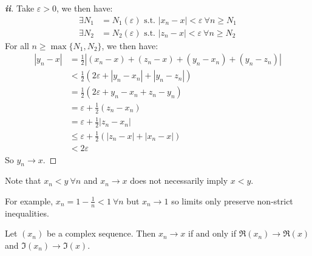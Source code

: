 \documentclass[../main.tex]{subfiles}
\begin{document}
\begin{proof}[\textbf{ii}]
  Take $\varepsilon > 0$, we then have:
  \begin{align*}
    \exists N_1 &= N_1(\varepsilon) \text{ s.t. } |x_n - x| < \varepsilon\ \forall n \geq N_1 \\
    \exists N_2 &= N_2(\varepsilon) \text{ s.t. } |z_n - x| < \varepsilon\ \forall n \geq N_2
  \end{align*}
  For all $n \geq \max\{N_1, N_2\}$, we then have:
  \begin{align*}
    |y_n - x| &= \frac{1}{2}|(x_n - x) + (z_n - x) + (y_n - x_n) + (y_n - z_n)| \\
              &< \frac{1}{2}(2\varepsilon + |y_n - x_n| + |y_n - z_n|) \\
              &= \frac{1}{2}(2\varepsilon + y_n - x_n + z_n - y_n) \\
              &= \varepsilon + \frac{1}{2}(z_n - x_n) \\
              &= \varepsilon + \frac{1}{2}|z_n - x_n| \\
              &\leq \varepsilon + \frac{1}{2}(|z_n - x| + |x_n - x|) \\
              &< 2\varepsilon
  \end{align*}
  So $y_n \to x$.
\end{proof}
\begin{remark}
  Note that $x_n < y\ \forall n$ and $x_n \to x$ does not necessarily imply $x < y$.

  For example, $x_n = 1 - \frac{1}{n} < 1\ \forall n$ but $x_n \to 1$ so limits only preserve non-strict inequalities.
\end{remark}
\begin{lemma}
  Let $(x_n)$ be a complex sequence.
  Then $x_n \to x$ if and only if $\Re(x_n) \to \Re(x)$ and $\Im(x_n) \to \Im(x)$.
  \label{complexConvergence}
\end{lemma}
\end{document}
